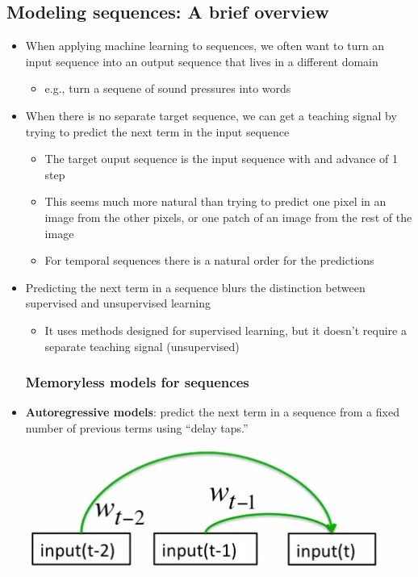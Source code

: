 \subsection{Modeling sequences: A brief overview}
\begin{itemize}
	\item When applying machine learning to sequences, we often want to turn an input sequence into an output sequence that lives in a different domain
	\begin{itemize}
		\item e.g., turn a sequene of sound pressures into words
	\end{itemize}

	\item When there is no separate target sequence, we can get a teaching signal by trying to predict the next term in the input sequence
	\begin{itemize}
		\item The target ouput sequence is the input sequence with and advance of 1 step
		\item This seems much more natural than trying to predict one pixel in an image from the other pixels, or one patch of an image from the rest of the image
		\item For temporal sequences there is a natural order for the predictions
	\end{itemize}

	\item Predicting the next term in a sequence blurs the distinction between supervised and unsupervised learning
	\begin{itemize}
		\item It uses methods designed for supervised learning, but it doesn't require a separate teaching signal (unsupervised)
	\end{itemize}

	\subsubsection{Memoryless models for sequences}
	\item \textbf{Autoregressive models}: predict the next term in a sequence from a fixed number of previous terms using ``delay taps.''
	\begin{center}
		\includegraphics[scale=0.7]{sections/7/autoreg.png}
	\end{center}


\end{itemize}
